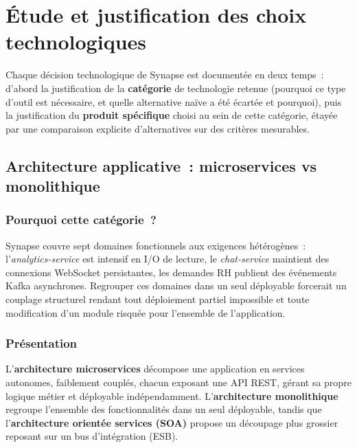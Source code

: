 ﻿%

\section{Étude et justification des choix technologiques}

Chaque décision technologique de Synapse est documentée en deux temps~:
d'abord la justification de la \textbf{catégorie} de technologie retenue
(pourquoi ce type d'outil est nécessaire, et quelle alternative naïve a été
écartée et pourquoi), puis la justification du \textbf{produit spécifique}
choisi au sein de cette catégorie, étayée par une comparaison explicite
d'alternatives sur des critères mesurables.

\subsection{Architecture applicative~: microservices vs monolithique}

\subsubsection*{Pourquoi cette catégorie~?}

Synapse couvre sept domaines fonctionnels aux exigences hétérogènes~: l'\textit{analytics-service} est intensif en I/O de lecture, le \textit{chat-service} maintient des connexions WebSocket persistantes, les demandes RH publient des événements Kafka asynchrones. Regrouper ces domaines dans un seul déployable forcerait un couplage structurel rendant tout déploiement partiel impossible et toute modification d'un module risquée pour l'ensemble de l'application.

\subsubsection*{Présentation}

L'\textbf{architecture microservices} décompose une application en services
autonomes, faiblement couplés, chacun exposant une API REST, gérant sa propre
logique métier et déployable indépendamment. L'\textbf{architecture monolithique}
regroupe l'ensemble des fonctionnalités dans un seul déployable, tandis que
l'\textbf{architecture orientée services (SOA)} propose un découpage plus grossier
reposant sur un bus d'intégration (ESB).

